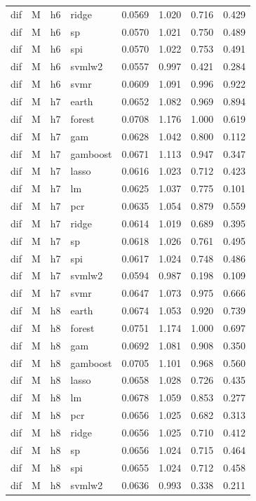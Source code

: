 \begin{ThreePartTable}
\begin{longtable}[t]{llclcccc}
dif & M & h6 & ridge & 0.0569 & 1.020 & 0.716 & 0.429\\
dif & M & h6 & sp & 0.0570 & 1.021 & 0.750 & 0.489\\
dif & M & h6 & spi & 0.0570 & 1.022 & 0.753 & 0.491\\
dif & M & h6 & svmlw2 & 0.0557 & 0.997 & 0.421 & 0.284\\
dif & M & h6 & svmr & 0.0609 & 1.091 & 0.996 & 0.922\\
\addlinespace
dif & M & h7 & earth & 0.0652 & 1.082 & 0.969 & 0.894\\
dif & M & h7 & forest & 0.0708 & 1.176 & 1.000 & 0.619\\
dif & M & h7 & gam & 0.0628 & 1.042 & 0.800 & 0.112\\
dif & M & h7 & gamboost & 0.0671 & 1.113 & 0.947 & 0.347\\
dif & M & h7 & lasso & 0.0616 & 1.023 & 0.712 & 0.423\\
dif & M & h7 & lm & 0.0625 & 1.037 & 0.775 & 0.101\\
dif & M & h7 & pcr & 0.0635 & 1.054 & 0.879 & 0.559\\
dif & M & h7 & ridge & 0.0614 & 1.019 & 0.689 & 0.395\\
dif & M & h7 & sp & 0.0618 & 1.026 & 0.761 & 0.495\\
dif & M & h7 & spi & 0.0617 & 1.024 & 0.748 & 0.486\\
dif & M & h7 & svmlw2 & 0.0594 & 0.987 & 0.198 & 0.109\\
dif & M & h7 & svmr & 0.0647 & 1.073 & 0.975 & 0.666\\
\addlinespace
dif & M & h8 & earth & 0.0674 & 1.053 & 0.920 & 0.739\\
dif & M & h8 & forest & 0.0751 & 1.174 & 1.000 & 0.697\\
dif & M & h8 & gam & 0.0692 & 1.081 & 0.908 & 0.350\\
dif & M & h8 & gamboost & 0.0705 & 1.101 & 0.968 & 0.560\\
dif & M & h8 & lasso & 0.0658 & 1.028 & 0.726 & 0.435\\
dif & M & h8 & lm & 0.0678 & 1.059 & 0.853 & 0.277\\
dif & M & h8 & pcr & 0.0656 & 1.025 & 0.682 & 0.313\\
dif & M & h8 & ridge & 0.0656 & 1.025 & 0.710 & 0.412\\
dif & M & h8 & sp & 0.0656 & 1.024 & 0.715 & 0.464\\
dif & M & h8 & spi & 0.0655 & 1.024 & 0.712 & 0.458\\
dif & M & h8 & svmlw2 & 0.0636 & 0.993 & 0.338 & 0.211\\

\end{longtable}
\end{ThreePartTable}
